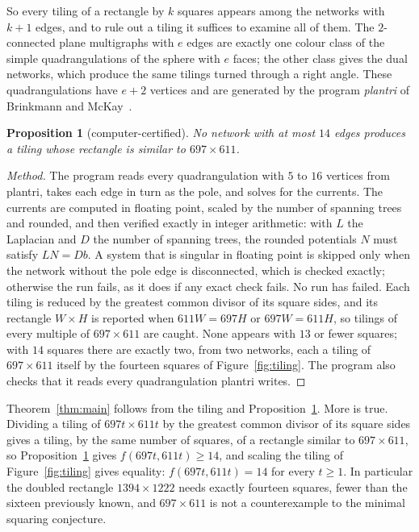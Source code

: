 \documentclass[11pt]{amsart}
\newtheorem{proposition}[theorem]{Proposition}
\theoremstyle{remark}
\begin{document}
So every tiling of a rectangle by $k$ squares appears among the networks with $k+1$ edges, and to rule
out a tiling it suffices to examine all of them. The $2$-connected plane multigraphs with $e$ edges
are exactly one colour class of the simple quadrangulations of the sphere with $e$ faces; the other
class gives the dual networks, which produce the same tilings turned through a right angle. These
quadrangulations have $e+2$ vertices and are generated by the program \emph{plantri} of Brinkmann
and McKay~\cite{plantri}.

\begin{proposition}[computer-certified]\label{prop:lower}
No network with at most $14$ edges produces a tiling whose rectangle is similar to $697\times611$.
\end{proposition}

\begin{proof}[Method]
The program  reads every quadrangulation with $5$ to $16$ vertices from
plantri, takes each edge in turn as the pole, and solves for the currents. The currents are computed in
floating point, scaled by the number of spanning trees and rounded, and then verified exactly in integer
arithmetic: with $L$ the Laplacian and $D$ the number of spanning trees, the rounded potentials $N$
must satisfy $LN=Db$. A system that is singular in floating point is skipped only when the network
without the pole edge is disconnected, which is checked exactly; otherwise the run fails, as it does if
any exact check fails. No run has failed. Each tiling is reduced by the greatest common divisor of its
square sides, and its rectangle $W\times H$ is reported when $611W=697H$ or $697W=611H$, so tilings of
every multiple of $697\times611$ are caught. None appears with $13$ or fewer squares; with $14$ squares
there are exactly two, from two networks, each a tiling of $697\times611$ itself by the fourteen squares
of Figure~\ref{fig:tiling}. The program  also checks that it reads every
quadrangulation plantri writes.
\end{proof}

Theorem~\ref{thm:main} follows from the tiling and Proposition~\ref{prop:lower}. More is true. Dividing a
tiling of $697t\times611t$ by the greatest common divisor of its square sides gives a tiling, by the same
number of squares, of a rectangle similar to $697\times611$, so Proposition~\ref{prop:lower} gives
$f(697t,611t)\ge14$, and scaling the tiling of Figure~\ref{fig:tiling} gives equality: $f(697t,611t)=14$
for every $t\ge1$. In particular the doubled rectangle $1394\times1222$ needs exactly fourteen squares,
fewer than the sixteen previously known, and $697\times611$ is not a counterexample to the minimal
squaring conjecture.
\end{document}

